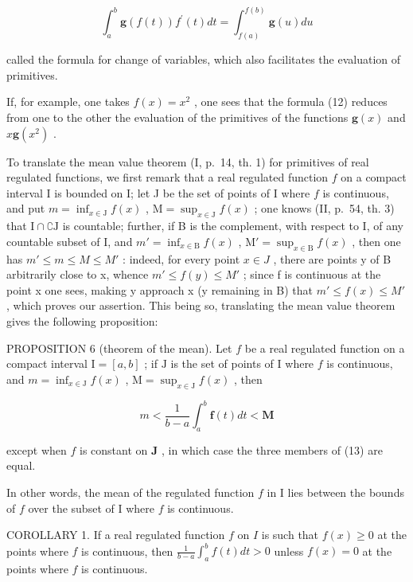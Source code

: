 \[
\int_ {a} ^ {b} \mathbf {g} (f (t)) f ^ {\prime} (t) d t = \int_ {f (a)} ^ {f (b)} \mathbf {g} (u) d u\tag{12}
\]

called the formula for change of variables, which also facilitates the evaluation of primitives.

If, for example, one takes \(f(x) = x^{2}\) , one sees that the formula (12) reduces from one to the other the evaluation of the primitives of the functions \(\mathbf{g}(x)\) and \(x\mathbf{g}(x^{2})\) .

To translate the mean value theorem (I, p.~14, th. 1) for primitives of real regulated functions, we first remark that a real regulated function \(f\) on a compact interval I is bounded on I; let J be the set of points of I where \(f\) is continuous, and put \(m = \inf_{x \in \mathrm{J}} f(x)\) , \(\mathrm{M} = \sup_{x \in \mathrm{J}} f(x)\) ; one knows (II, p.~54, th. 3) that \(\mathrm{I} \cap \complement \mathrm{J}\) is countable; further, if B is the complement, with respect to I, of any countable subset of I, and \(m' = \inf_{x \in \mathrm{B}} f(x)\) , \(\mathrm{M}' = \sup_{x \in \mathrm{B}} f(x)\) , then one has \(m' \leqslant m \leqslant M \leqslant M'\) : indeed, for every point \(x \in J\) , there are points y of B arbitrarily close to x, whence \(m' \leqslant f(y) \leqslant M'\) ; since f is continuous at the point x one sees, making y approach x (y remaining in B) that \(m' \leqslant f(x) \leqslant M'\) , which proves our assertion. This being so, translating the mean value theorem gives the following proposition:

PROPOSITION 6 (theorem of the mean). Let \(f\) be a real regulated function on a compact interval \(\mathrm{I} = [a, b]\) ; if \(\mathrm{J}\) is the set of points of \(\mathrm{I}\) where \(f\) is continuous, and \(m = \inf_{x \in \mathrm{J}} f(x)\) , \(\mathrm{M} = \sup_{x \in \mathrm{J}} f(x)\) , then

\[
m <   \frac {1}{b - a} \int_ {a} ^ {b} \mathbf {f} (t) d t <   \mathbf {M}\tag{13}
\]

except when \(f\) is constant on \(\mathbf{J}\) , in which case the three members of (13) are equal.

In other words, the mean of the regulated function \(f\) in I lies between the bounds of \(f\) over the subset of I where \(f\) is continuous.

COROLLARY 1. If a real regulated function \(f\) on \(I\) is such that \(f(x) \geqslant 0\) at the points where \(f\) is continuous, then \(\frac{1}{b - a} \int_{a}^{b} f(t) dt > 0\) unless \(f(x) = 0\) at the points where \(f\) is continuous.

